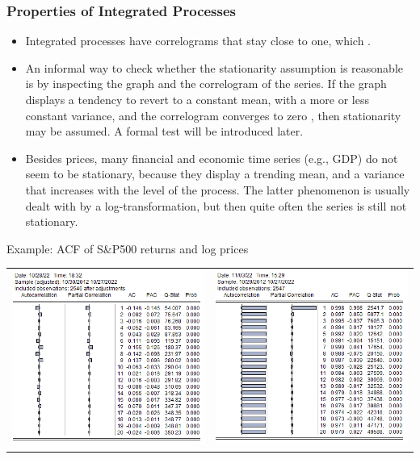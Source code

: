 \begin{frame}
\frametitle{Properties of Integrated Processes}
\begin{itemize}
\item  Integrated processes have correlograms that stay close to one, which .
\item An informal way to check whether the stationarity assumption is
reasonable is by inspecting the graph and the correlogram of the series. If
the graph displays a tendency to revert to a constant mean, with a
more or less constant variance, and the correlogram converges to zero
, then stationarity may be assumed. A formal test will be introduced later.
\item Besides prices, many financial and economic time series (e.g., GDP) do not seem to be stationary,
because they display a trending mean, and a variance that increases with the
level of the process. The latter phenomenon is usually dealt with by a
log-transformation, but then quite often the series is still not stationary.
\end{itemize}
\end{frame}
\begin{frame}
\begin{block}{Example: ACF of S\&P500 returns and log prices}
\begin{centering}
\begin{tabular}{cc}
\includegraphics[width=.45\textwidth]{correlogram}&
\includegraphics[width=.45\textwidth]{correlogram2}
\end{tabular}
\end{centering}
\end{block}
\end{frame}
